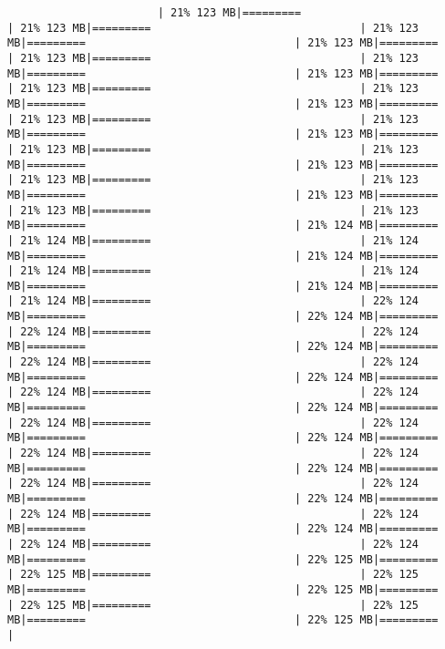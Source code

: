 \documentclass[
]{article}
\begin{document}
\begin{verbatim}
                       | 21% 123 MB|=========                                | 21% 123 MB|=========                                | 21% 123 MB|=========                                | 21% 123 MB|=========                                | 21% 123 MB|=========                                | 21% 123 MB|=========                                | 21% 123 MB|=========                                | 21% 123 MB|=========                                | 21% 123 MB|=========                                | 21% 123 MB|=========                                | 21% 123 MB|=========                                | 21% 123 MB|=========                                | 21% 123 MB|=========                                | 21% 123 MB|=========                                | 21% 123 MB|=========                                | 21% 123 MB|=========                                | 21% 123 MB|=========                                | 21% 123 MB|=========                                | 21% 123 MB|=========                                | 21% 123 MB|=========                                | 21% 123 MB|=========                                | 21% 124 MB|=========                                | 21% 124 MB|=========                                | 21% 124 MB|=========                                | 21% 124 MB|=========                                | 21% 124 MB|=========                                | 21% 124 MB|=========                                | 21% 124 MB|=========                                | 21% 124 MB|=========                                | 22% 124 MB|=========                                | 22% 124 MB|=========                                | 22% 124 MB|=========                                | 22% 124 MB|=========                                | 22% 124 MB|=========                                | 22% 124 MB|=========                                | 22% 124 MB|=========                                | 22% 124 MB|=========                                | 22% 124 MB|=========                                | 22% 124 MB|=========                                | 22% 124 MB|=========                                | 22% 124 MB|=========                                | 22% 124 MB|=========                                | 22% 124 MB|=========                                | 22% 124 MB|=========                                | 22% 124 MB|=========                                | 22% 124 MB|=========                                | 22% 124 MB|=========                                | 22% 124 MB|=========                                | 22% 124 MB|=========                                | 22% 124 MB|=========                                | 22% 124 MB|=========                                | 22% 124 MB|=========                                | 22% 124 MB|=========                                | 22% 124 MB|=========                                | 22% 125 MB|=========                                | 22% 125 MB|=========                                | 22% 125 MB|=========                                | 22% 125 MB|=========                                | 22% 125 MB|=========                                | 22% 125 MB|=========                                | 22% 125 MB|=========                                | 
\end{verbatim}
\end{document}
